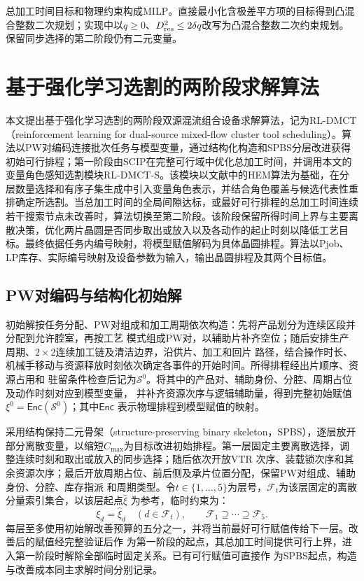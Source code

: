\documentclass[final,5p,times,twocolumn]{elsarticle}
\begin{document}
总加工时间目标和物理约束构成MILP。直接最小化含极差平方项的目标得到凸混合整数二次规划；实现中以$q\ge0$、$D_{\rm res}^2\le2\delta q$改写为凸混合整数二次约束规划。保留同步选择的第二阶段仍有二元变量。

\section{基于强化学习选割的两阶段求解算法}
\label{sec:algorithm-cn}

本文提出基于强化学习选割的两阶段双源混流组合设备求解算法，记为RL-DMCT（reinforcement learning for dual-source mixed-flow cluster tool scheduling）。算法以PW对编码连接批次任务与模型变量，通过结构化构造和SPBS分层改进获得初始可行排程；第一阶段由SCIP在完整可行域中优化总加工时间，并调用本文的变量角色感知选割模块RL-DMCT-S。该模块以文献中的HEM算法为基础，在分层数量选择和有序子集生成中引入变量角色表示，并结合角色覆盖与候选代表性重排确定所选割\citep{achterberg2009scip,bestuzheva2023scip,wang2023hem}。当总加工时间的全局间隙达标，或最好可行排程的总加工时间连续若干搜索节点未改善时，算法切换至第二阶段。该阶段保留所得时间上界与主要离散决策，优化两片晶圆是否同步取出或放入以及各动作的起止时刻以降低工艺目标。最终依据任务内编号映射，将模型赋值解码为具体晶圆排程。算法以Pjob、LP库存、实际编号映射及设备参数为输入，输出晶圆排程及其两个目标值。

\subsection{PW对编码与结构化初始解}
\label{sec:pjob-encoding-cn}

初始解按任务分配、PW对组成和加工周期依次构造：先将产品划分为连续区段并分配到允许腔室，再按工艺
模式组成PW对，以辅助片补齐空位；随后安排生产周期、$2\times2$连续加工链及清洁边界，沿供片、加工和回片
路径，结合操作时长、机械手移动与资源释放时刻依次确定各事件的开始时间。所得排程经出片顺序、资源占用和
驻留条件检查后记为$\mathcal S^0$。将其中的产品对、辅助身份、分腔、周期占位及动作时刻对应到模型变量，
并补齐资源次序与逻辑辅助量，得到完整初始赋值$\xi^0=\mathsf{Enc}(\mathcal S^0)$；其中$\mathsf{Enc}$
表示物理排程到模型赋值的映射。

采用结构保持二元骨架（structure-preserving binary skeleton，SPBS），逐层放开部分离散变量，以缩短$C_{\max}$为目标改进初始排程。第一层固定主要离散选择，调整连续时刻和取出或放入的同步选择；随后依次开放VTR
次序、装载锁次序和其余资源次序；最后开放周期占位、前后侧及承片位置分配，保留PW对组成、辅助身份、分腔、库存指派
和周期类型。令$t\in\{1,\ldots,5\}$为层号，$\mathcal F_t$为该层固定的离散分量索引集合，以该层起点$\widehat\xi$
为参考，临时约束为：
\begin{equation}
\xi_d=\widehat\xi_d\quad(d\in\mathcal F_t),\qquad
\mathcal F_1\supseteq\cdots\supseteq\mathcal F_5.
\label{eq:spbs-fix-cn}
\end{equation}
每层至多使用初始解改善预算的五分之一，并将当前最好可行赋值传给下一层。改善后的赋值经完整验证后作
为第一阶段的起点，其总加工时间提供可行上界，进入第一阶段时解除全部临时固定关系。已有可行赋值可直接作
为SPBS起点，构造与改善成本同主求解时间分别记录。
\end{document}
